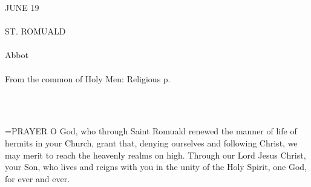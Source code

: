 \begin{center}\normalsize \begin{center}\normalsize JUNE 19\\\\
\footnotesize \footnotesize ST. ROMUALD\\\\
\footnotesize \footnotesize Abbot\\\\
\footnotesize \footnotesize From the common of Holy Men: Religious p. \\\\
\footnotesize \end{center}\\
\end{center}

\hangindent=\parindent \small{PRAYER 
O God, who through Saint Romuald renewed
the manner of life of hermits in your Church,
grant that, denying ourselves and following Christ,
we may merit to reach the heavenly realms on high.
Through our Lord Jesus Christ, your Son,
who lives and reigns with you in the unity of the Holy Spirit,
one God, for ever and ever.\\}
 

